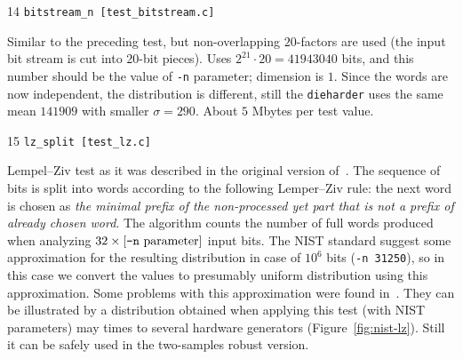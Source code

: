 \documentclass[12pt,a4paper,fullpage]{article}
\begin{document}
\begin{description}
\item{14} \texttt{bitstream\_n [test\_bitstream.c]}

Similar to the preceding test, but non-overlapping $20$-factors are used (the input bit stream is cut into $20$-bit pieces). Uses $2^{21}\cdot 20=41943040$ bits, and this number should be the value of \texttt{-n} parameter; dimension is $1$. Since the words are now independent, the distribution is different, still the \texttt{dieharder} uses the same mean $141909$ with smaller $\sigma=290$.  About $5$ Mbytes per test value.

\item{15} \texttt{lz\_split [test\_lz.c]}

Lempel--Ziv test as it was described in the original version of~\cite{nistsp800-22-1a}. The sequence of bits is split into words according to the following Lemper--Ziv rule: the next word is chosen as \emph{the minimal prefix of the non-processed yet part that is not a prefix of already chosen word}. The algorithm counts the number of full words produced when analyzing $32\times[\text{\texttt{-n} parameter}]$ input bits. The NIST standard suggest some approximation for the resulting distribution in case of $10^6$ bits (\texttt{-n 31250}), so in this case we convert the values to presumably uniform distribution using this approximation. Some problems with this approximation were found in~\cite{kim-umeno-hasegawa}. They can be illustrated by a distribution obtained when applying this test (with NIST parameters) may times to several hardware generators (Figure~\ref{fig:nist-lz}). Still it can be safely used in the two-samples robust version.


\end{description}
\end{document}
